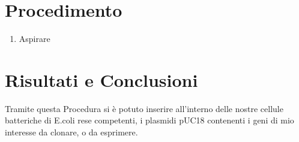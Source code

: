 \documentclass{article}
\begin{document}
\section{Procedimento}

\begin{enumerate}

\item Aspirare


\end{enumerate}


\section{Risultati e Conclusioni}

Tramite questa Procedura si è potuto inserire all'interno delle nostre cellule batteriche di E.coli rese competenti, i plasmidi pUC18 contenenti i geni di mio interesse da clonare, o da esprimere.
\end{document}
